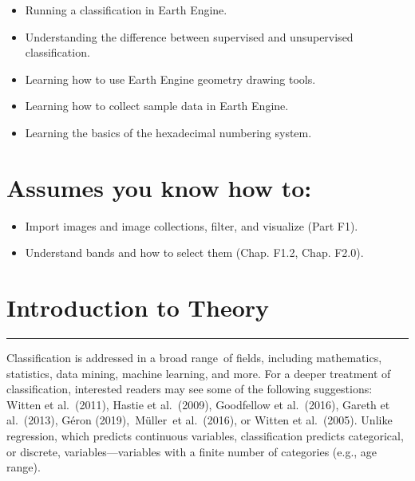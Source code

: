 \documentclass[
  letterpaper,
  DIV=11,
  numbers=noendperiod]{scrreprt}
\providecommand{\tightlist}{%
  \setlength{\itemsep}{0pt}\setlength{\parskip}{0pt}}\usepackage{longtable,booktabs,array}
\begin{document}

\begin{itemize}
\tightlist
\item
  Running a classification in Earth Engine.
\item
  Understanding the difference between supervised and unsupervised
  classification.
\item
  Learning how to use Earth Engine geometry drawing tools.
\item
  Learning how to collect sample data in Earth Engine.
\item
  Learning the basics of the hexadecimal numbering system.
\end{itemize}

\hypertarget{assumes-you-know-how-to-5}{%
\section*{Assumes you know how to:}\label{assumes-you-know-how-to-5}}


\begin{itemize}
\tightlist
\item
  Import images and image collections, filter, and visualize (Part F1).
\item
  Understand bands and how to select them (Chap. F1.2, Chap. F2.0).
\end{itemize}

\hypertarget{introduction-to-theory-1}{%
\section*{Introduction to Theory}\label{introduction-to-theory-1}}


\begin{center}\rule{0.5\linewidth}{0.5pt}\end{center}

Classification is addressed in a broad range~of fields, including
mathematics, statistics, data mining, machine learning, and more. For a
deeper treatment of classification, interested readers may see some of
the following suggestions: Witten et al.~(2011), Hastie et al.~(2009),
Goodfellow et al.~(2016), Gareth et al.~(2013), Géron (2019),~Müller~et
al.~(2016), or Witten et al.~(2005). Unlike regression, which predicts
continuous variables, classification predicts categorical, or discrete,
variables---variables with a finite number of categories (e.g., age
range).
\end{document}
